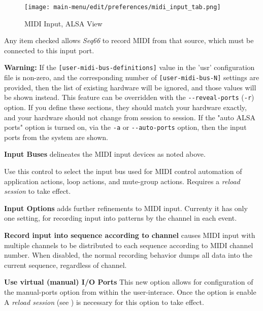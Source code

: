 \begin{figure}[H]
   \centering 
   \texttt{[image: main-menu/edit/preferences/midi\_input\_tab.png]}
   \caption{MIDI Input, ALSA View}
   \label{fig:midi_input_tab}
\end{figure}

   Any item checked allows \textsl{Seq66} to record MIDI from that source,
   which must be connected to this input port.

   \textbf{Warning:}
   If the 
   \texttt{[user-midi-bus-definitions]} value in the 'usr' configuration file
   is non-zero, and the
   corresponding number of
   \texttt{[user-midi-bus-N]} settings are provided, then
   the list of existing hardware will be ignored, and those values will be
   shown instead.
   This feature can be overridden with the
   \texttt{-{}-reveal-ports} (\texttt{-r}) option.
   If you define these sections, they should match your
   hardware exactly, and your hardware should not change from session to
   session.
   If the "auto ALSA ports" option is turned on, via the \texttt{-a} or
   \texttt{-{}-auto-ports} option, then
   the input ports from the system are shown.

   \setcounter{ItemCounter}{0}      %

   \textbf{Input Buses} delineates the MIDI input devices as noted above.

   Use this control to select the input bus used for MIDI control automation of 
   application actions, loop actions, and mute-group actions.
   Requires a \textsl{reload session} to take effect.

   \textbf{Input Options} adds further refinements to MIDI input.
   Currenty it has only one setting, for recording input into patterns by the
   channel in each event.

   \textbf{Record input into sequence according to channel}
   causes MIDI input with multiple channels to be distributed to
   each sequence according to MIDI channel number.
   When disabled, the normal recording behavior dumps all data into the current
   sequence, regardless of channel.

   \textbf{Use virtual (manual) I/O Ports}
   This new option
   allows for configuration of the manual-ports option from within the
   user-interace. 
   Once the option is enable
   A \textsl{reload session} (see )
   is necessary for this option to take effect.

